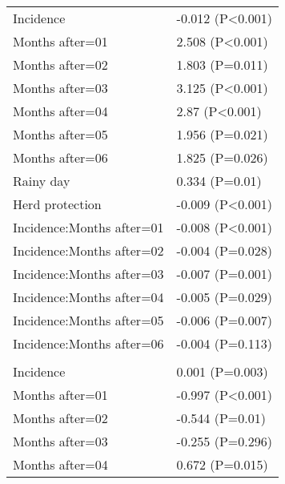 \documentclass[]{article}
\begin{document}
\begin{longtable}[t]{ll}
\hspace{1em}Incidence & -0.012 (P<0.001)\\
\hspace{1em}Months after=01 & 2.508 (P<0.001)\\
\hspace{1em}Months after=02 & 1.803 (P=0.011)\\
\hspace{1em}Months after=03 & 3.125 (P<0.001)\\
\hspace{1em}Months after=04 & 2.87 (P<0.001)\\
\hspace{1em}Months after=05 & 1.956 (P=0.021)\\
\hspace{1em}Months after=06 & 1.825 (P=0.026)\\
\hspace{1em}Rainy day & 0.334 (P=0.01)\\
\hspace{1em}Herd protection & -0.009 (P<0.001)\\
\hspace{1em}Incidence:Months after=01 & -0.008 (P<0.001)\\
\hspace{1em}Incidence:Months after=02 & -0.004 (P=0.028)\\
\hspace{1em}Incidence:Months after=03 & -0.007 (P=0.001)\\
\hspace{1em}Incidence:Months after=04 & -0.005 (P=0.029)\\
\hspace{1em}Incidence:Months after=05 & -0.006 (P=0.007)\\
\hspace{1em}Incidence:Months after=06 & -0.004 (P=0.113)\\
\addlinespace[1.5em]
\multicolumn{2}{l}{\textbf{Temporary field worker}}\\
\hspace{1em}Incidence & 0.001 (P=0.003)\\
\hspace{1em}Months after=01 & -0.997 (P<0.001)\\
\hspace{1em}Months after=02 & -0.544 (P=0.01)\\
\hspace{1em}Months after=03 & -0.255 (P=0.296)\\
\hspace{1em}Months after=04 & 0.672 (P=0.015)\\

\end{longtable}
\end{document}

